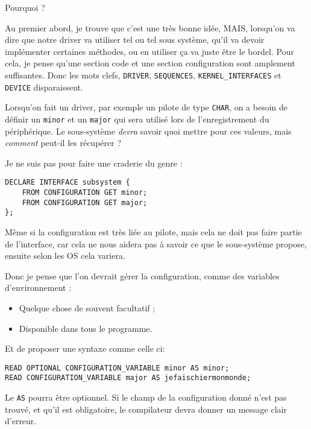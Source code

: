 \documentclass{rtxreport}
\begin{document}
Pourquoi ? 

Au premier abord, je trouve que c’est une très bonne idée, MAIS, lorsqu’on va
dire que notre driver va utiliser tel ou tel sous système, qu’il va devoir
implémenter certaines méthodes, ou en utiliser ça va juste être le
bordel\footnotemark[7].  Pour cela, je pense qu’une section code et une section
configuration sont amplement suffisantes. Donc les mots clefs, \texttt{DRIVER},
\texttt{SEQUENCES}, \texttt{KERNEL\_INTERFACES} et \texttt{DEVICE}
disparaissent. 

Lorsqu’on fait un driver, par exemple un pilote de type \texttt{CHAR}, on a
besoin de définir un \texttt{minor} et un \texttt{major} qui sera utilisé lors
de l’enregistrement du périphérique. Le sous-système \emph{devra} savoir quoi
mettre pour ces valeurs, mais \emph{comment} peut-il les récupérer ?
\footnotemark[8]



Je ne suis pas pour faire une craderie du genre :

\begin{lstlisting}
DECLARE INTERFACE subsystem {
	FROM CONFIGURATION GET minor;
	FROM CONFIGURATION GET major;
};
\end{lstlisting}
Même si la configuration est très liée au pilote, mais cela ne doit pas faire
partie de l’interface, car cela ne nous aidera pas à savoir ce que le
sous-système propose, ensuite selon les OS cela variera.


Donc je pense que l’on devrait gérer la configuration, comme des variables
d’environnement :
\begin{itemize}
	\item Quelque chose de souvent facultatif ; 
	\item Disponible dans tous le programme.
\end{itemize}

Et de proposer une syntaxe comme celle ci:

\begin{lstlisting}
READ OPTIONAL CONFIGURATION_VARIABLE minor AS minor;
READ CONFIGURATION_VARIABLE major AS jefaischiermonmonde;
\end{lstlisting}
Le \texttt{AS} pourra être optionnel. Si le champ de la configuration donné
n’est pas trouvé, et qu’il est obligatoire, le compilateur devra donner un
message clair d’erreur.\footnotemark[9]
\end{document}
